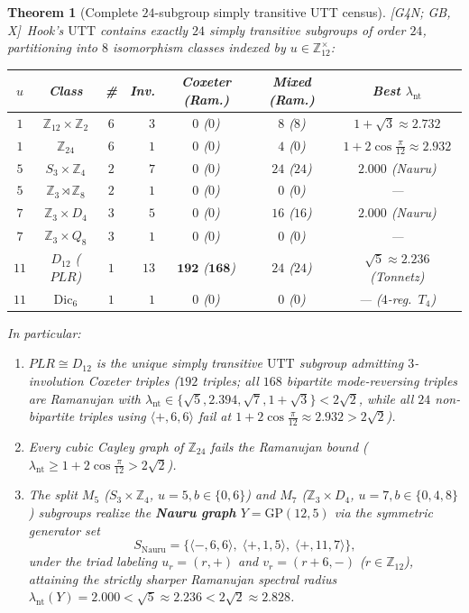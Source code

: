 \documentclass[11pt]{amsart}
\numberwithin{equation}{section}
\theoremstyle{plain}
\newtheorem{theorem}{Theorem}[section]
\theoremstyle{definition}\newtheorem{definition}[theorem]{Definition}
\theoremstyle{remark}\newtheorem{remark}[theorem]{Remark}
\newcommand{\Z}{\mathbb{Z}}
\newcommand{\UTT}{\mathrm{UTT}}
\newcommand{\GP}{\mathrm{GP}}
\newcommand{\ctag}[1]{\textup{\textsf{\scriptsize[#1]}}}
\begin{document}
\begin{theorem}[Complete $24$-subgroup simply transitive UTT census]\label{thm:census}
\ctag{G4N; GB, X}\ Hook's $\UTT$ contains exactly $24$ simply transitive subgroups of order $24$, partitioning into $8$ isomorphism classes indexed by $u\in\Z_{12}^\times$:
\begin{center}\footnotesize\setlength{\tabcolsep}{3.5pt}
\begin{tabular}{cccrccc}\toprule
$u$ & Class & \# & Inv. & Coxeter (Ram.) & Mixed (Ram.) & Best $\lambda_{\mathrm{nt}}$ \\\midrule
$1$ & $\Z_{12}{\times}\Z_2$ & $6$ & $3$ & $0$ ($0$) & $8$ ($8$) & $1{+}\sqrt{3}\approx 2.732$ \\
$1$ & $\Z_{24}$ & $6$ & $1$ & $0$ ($0$) & $4$ ($0$) & $1{+}2\cos\frac{\pi}{12}\approx 2.932$ \\
$5$ & $S_3{\times}\Z_4$ & $2$ & $7$ & $0$ ($0$) & $24$ ($24$) & $\mathbf{2.000}$ (Nauru) \\
$5$ & $\Z_3{\rtimes}\Z_8$ & $2$ & $1$ & $0$ ($0$) & $0$ ($0$) & --- \\
$7$ & $\Z_3{\times}D_4$ & $3$ & $5$ & $0$ ($0$) & $16$ ($16$) & $\mathbf{2.000}$ (Nauru) \\
$7$ & $\Z_3{\times}Q_8$ & $3$ & $1$ & $0$ ($0$) & $0$ ($0$) & --- \\
$11$ & $D_{12}$ ($PLR$) & $1$ & $13$ & $\mathbf{192}$ ($\mathbf{168}$) & $24$ ($24$) & $\sqrt{5}\approx 2.236$ (Tonnetz) \\
$11$ & $\mathrm{Dic}_6$ & $1$ & $1$ & $0$ ($0$) & $0$ ($0$) & --- ($4$-reg.\ $T_4$) \\\bottomrule
\end{tabular}
\end{center}
In particular:
\begin{enumerate}[label=(\alph*),nosep]
\item $PLR\cong D_{12}$ is the \emph{unique} simply transitive $\UTT$ subgroup admitting $3$-involution Coxeter triples ($192$ triples; all $168$ bipartite mode-reversing triples are Ramanujan with $\lambda_{\mathrm{nt}}\in\{\sqrt{5},2.394,\sqrt{7},1+\sqrt{3}\}<2\sqrt{2}$, while all $24$ non-bipartite triples using $\langle +,6,6\rangle$ fail at $1+2\cos\frac{\pi}{12}\approx 2.932>2\sqrt{2}$).
\item Every cubic Cayley graph of $\Z_{24}$ fails the Ramanujan bound ($\lambda_{\mathrm{nt}}\ge 1+2\cos\frac{\pi}{12}>2\sqrt{2}$).
\item The split $M_5$ ($S_3\times\Z_4$, $u=5,b\in\{0,6\}$) and $M_7$ ($\Z_3\times D_4$, $u=7,b\in\{0,4,8\}$) subgroups realize the \textbf{Nauru graph} $Y=\GP(12,5)$ via the symmetric generator set
\begin{equation}\label{eq:nauru_utt}
S_{\mathrm{Nauru}} = \bigl\{\langle -,6,6\rangle,\;\langle +,1,5\rangle,\;\langle +,11,7\rangle\bigr\},
\end{equation}
under the triad labeling $u_r=(r,+)$ and $v_r=(r+6,-)$ ($r\in\Z_{12}$), attaining the strictly sharper Ramanujan spectral radius $\lambda_{\mathrm{nt}}(Y)=2.000<\sqrt{5}\approx 2.236<2\sqrt{2}\approx 2.828$.
\end{enumerate}
\end{theorem}
\end{document}

